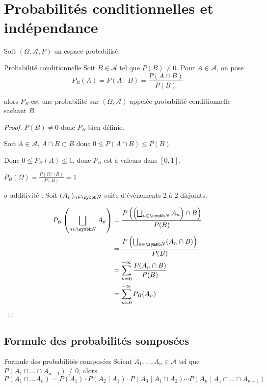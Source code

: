 \section{Probabilités conditionnelles et indépendance }

Soit $(\Omega, \mathcal A , P)$ un espace probabilisé.

\begin{theoreme}{Probabilité conditionnelle}{}
    Soit $B \in \mathcal A$ tel que $P(B) \neq 0$. Pour $A \in \mathcal A$, on pose 
    $$P_B(A) = P(A \mid B) = \frac{P(A \cap B)}{P(B)}$$

    alors $P_B$ est une probabilité sur $(\Omega, \mathcal A)$ appelée probabilité conditionnelle
    sachant $B$.
\end{theoreme}

\begin{proof}
    $P(B) \neq 0$ donc $P_B$ bien définie. 

    Soit $A \in \mathcal A$, $A \cap B \subset B$ donc $0 \leqslant P(A \cap B) \leqslant P(B)$

    Donc $0 \leqslant P_B(A) \leqslant 1$, donc $P_B$ est à valeurs dans $[0, 1]$.

    $P_B(\Omega) = \frac{P(\Omega \cap B)}{P(B)} = 1$ 

    $\sigma$-additivité : Soit $(A_n)_{n \in \N}$ suite d'évènements 2 à 2 disjoints.

    \begin{align}
        P_B\left( \bigsqcup_{n \in \N} A_n \right) & = \frac{P\left( \left( \bigsqcup_{n \in \N} A_n \right) \cap B \right)}{P(B)} \\
        & = \frac{P\left( \bigsqcup_{n \in \N} (A_n \cap B) \right)}{P(B)} \\
        & = \sum_{n = 0 }^{+ \infty } \frac{P(A_n \cap B)}{P(B)} \\
        & = \sum_{n = 0}^{+ \infty} P_B(A_n)
    \end{align}
\end{proof}

\subsection{Formule des probabilités somposées }

\begin{theoreme}{Formule des probabilités composées}{}
    Soient $A_1, \dots, A_n \in \mathcal A$ tel que $P(A_1 \cap \dots \cap A_{n - 1}) \neq 0$,
    alors $$P(A_1 \cap \dots A_n) = P(A_1) \cdot P(A_2 \mid A_1) \cdot P(A_3 \mid A_1 \cap A_2) \cdots P(A_n \mid A_1 \cap \dots \cap A_{n - 1})$$
\end{theoreme}

